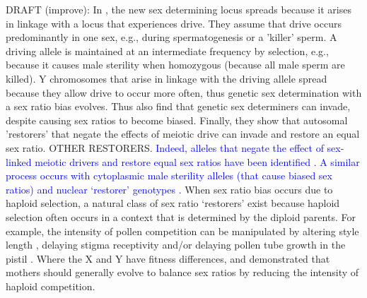 \documentclass[12pt]{article}
\begin{document}
DRAFT (improve): In \citet{Ubeda:2015fx}, the new sex determining locus spreads because it arises in linkage with a locus that experiences drive. They assume that drive occurs predominantly in one sex, e.g., during spermatogenesis or a 'killer' sperm. A driving allele is maintained at an intermediate frequency by selection, e.g., because it causes male sterility when homozygous (because all male sperm are killed). Y chromosomes that arise in linkage with the driving allele spread because they allow drive to occur more often, thus genetic sex determination with a sex ratio bias evolves. 
Thus \citet{Ubeda:2015fx} also find that genetic sex determiners can invade, despite causing sex ratios to become biased. 
Finally, they show that autosomal 'restorers' that negate the effects of meiotic drive can invade and restore an equal sex ratio. 
OTHER RESTORERS.
\textcolor{blue}{Indeed, alleles that negate the effect of sex-linked meiotic drivers and restore equal sex ratios have been identified \citep{Stalker:1961th,Smith:1975ft}. 
A similar process occurs with cytoplasmic male sterility alleles (that cause biased sex ratios) and nuclear `restorer' genotypes \citep{Frank:1989vl}. 
}
When sex ratio bias occurs due to haploid selection, a natural class of sex ratio `restorers' exist because haploid selection often occurs in a context that is determined by the diploid parents. 
For example, the intensity of pollen competition can be manipulated by altering style length \citep{Travers:2001,Lankinen:2001gc,Ruane:2009vt}, delaying stigma receptivity \citep{Galen:1986wq,Lankinen:2011if} and/or delaying pollen tube growth in the pistil \citep{Herrero:2003jf}. 
Where the X and Y have fitness differences, \citet{Hough:2013uo} and \citet{Otto:2015va} demonstrated that mothers should generally evolve to balance sex ratios by reducing the intensity of haploid competition. 

{\color{red}{Despite the fact that sex ratio restorers can evolve, we find that sex chromosome turnover occurs regardless of sex ratio bias (Figure 3).}}
\end{document}
